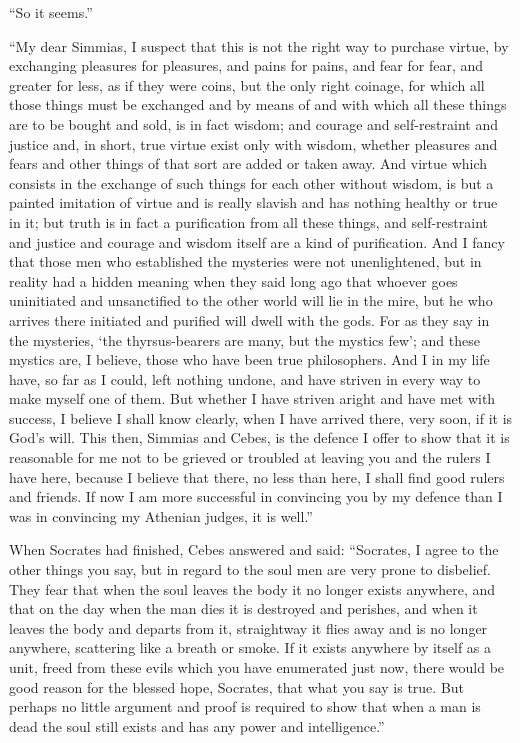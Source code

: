 \documentclass[letterpaper,12pt]{article}
\newcommand{\stephpag}[1]{\marginnote{\small\itshape\fontfamily{ppl}\selectfont #1}}
\begin{document}
\begin{drama}
``So it seems.''
 
``My dear Simmias, I suspect that this is not the right way to purchase virtue, by exchanging pleasures for pleasures, and pains for pains, and fear for fear, and greater for less, as if they were coins, but the only right coinage, for which all those things \stephpag{b} must be exchanged and by means of and with which all these things are to be bought and sold, is in fact wisdom; and courage and self-restraint and justice and, in short, true virtue exist only with wisdom, whether pleasures and fears and other things of that sort are added or taken away. And virtue which consists in the exchange of such things for each other without wisdom, is but a painted imitation of virtue and is really slavish and has nothing healthy or true in it; but truth is in fact a purification \stephpag{c} from all these things, and self-restraint and justice and courage and wisdom itself are a kind of purification. And I fancy that those men who established the mysteries were not unenlightened, but in reality had a hidden meaning when they said long ago that whoever goes uninitiated and unsanctified to the other world will lie in the mire, but he who arrives there initiated and purified will dwell with the gods. For as they say in the mysteries, `the thyrsus-bearers are many, but the mystics few'; \stephpag{d} and these mystics are, I believe, those who have been true philosophers. And I in my life have, so far as I could, left nothing undone, and have striven in every way to make myself one of them. But whether I have striven aright and have met with success, I believe I shall know clearly, when I have arrived there, very soon, if it is God's will. This then, Simmias and Cebes, is the defence I offer to show that it is reasonable for me not to be grieved or troubled at leaving you and the rulers I have here, \stephpag{e} because I believe that there, no less than here, I shall find good rulers and friends. If now I am more successful in convincing you by my defence than I was in convincing my Athenian judges, it is well.''
 
When Socrates had finished, Cebes answered and said: ``Socrates, I agree to \stephpag{70 a} the other things you say, but in regard to the soul men are very prone to disbelief. They fear that when the soul leaves the body it no longer exists anywhere, and that on the day when the man dies it is destroyed and perishes, and when it leaves the body and departs from it, straightway it flies away and is no longer anywhere, scattering like a breath or smoke. If it exists anywhere by itself as a unit, freed from these evils which you have enumerated just now, \stephpag{b} there would be good reason for the blessed hope, Socrates, that what you say is true. But perhaps no little argument and proof is required to show that when a man is dead the soul still exists and has any power and intelligence.''
 

\end{drama}
\end{document}
